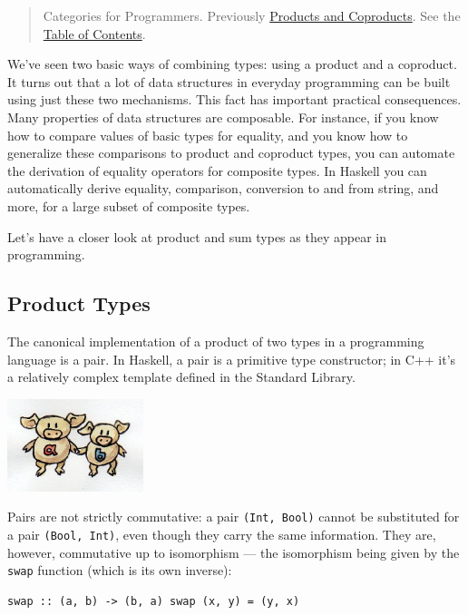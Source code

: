 \begin{quote}
Categories for Programmers. Previously
\href{https://bartoszmilewski.com/2015/01/07/products-and-coproducts/}{Products
and Coproducts}. See the
\href{https://bartoszmilewski.com/2014/10/28/category-theory-for-programmers-the-preface/}{Table
of Contents}.
\end{quote}

We've seen two basic ways of combining types: using a product and a
coproduct. It turns out that a lot of data structures in everyday
programming can be built using just these two mechanisms. This fact has
important practical consequences. Many properties of data structures are
composable. For instance, if you know how to compare values of basic
types for equality, and you know how to generalize these comparisons to
product and coproduct types, you can automate the derivation of equality
operators for composite types. In Haskell you can automatically derive
equality, comparison, conversion to and from string, and more, for a
large subset of composite types.

Let's have a closer look at product and sum types as they appear in
programming.

\subsection{Product Types}\label{product-types}

The canonical implementation of a product of two types in a programming
language is a pair. In Haskell, a pair is a primitive type constructor;
in C++ it's a relatively complex template defined in the Standard
Library.

\includegraphics[width=1.56250in]{images/pair.jpg}

Pairs are not strictly commutative: a pair \texttt{(Int,\ Bool)} cannot
be substituted for a pair \texttt{(Bool,\ Int)}, even though they carry
the same information. They are, however, commutative up to isomorphism
--- the isomorphism being given by the \texttt{swap} function (which is
its own inverse):

\begin{verbatim}
swap :: (a, b) -> (b, a) swap (x, y) = (y, x)
\end{verbatim}

